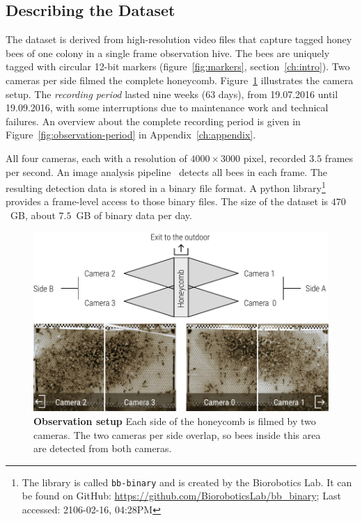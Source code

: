 \subsection{Describing the Dataset}
\label{sec:dataset}
The dataset is derived from high-resolution video files that capture tagged honey bees of one colony in a single frame observation hive.
The bees are uniquely tagged with circular 12-bit markers (figure~\ref{fig:markers}, section~\ref{ch:intro}).
Two cameras per side filmed the complete honeycomb.
Figure~\ref{fig:obssetup} illustrates the camera setup.
The \emph{recording period} lasted nine weeks (63 days), from 19.07.2016 until 19.09.2016, with some interruptions due to maintenance work and technical failures.
An overview about the complete recording period is given in Figure~\ref{fig:observation-period} in Appendix~\ref{ch:appendix}.

All four cameras, each with a resolution of $4000\times3000$ pixel, recorded $3.5$ frames per second. 
An image analysis pipeline~\cite{wario2015automatic} detects all bees in each frame.
The resulting detection data is stored in a binary file format.
A python library\footnote{The library is called \texttt{bb-binary} and is created by the Biorobotics Lab. It can be found on GitHub: \url{https://github.com/BioroboticsLab/bb_binary}; Last accessed: 2106-02-16, 04:28PM} provides a frame-level access to those binary files.
The size of the dataset is $470$~GB, about $7.5$~GB of binary data per day.

\begin{figure}
	\centering
	\includegraphics[width=1.0\textwidth]{Figures/setupCams}
 	\caption[Observation setup]{\textbf{Observation setup} Each side of the honeycomb is filmed by two cameras. The two cameras per side overlap, so bees inside this area are detected from both cameras.}
 	\label{fig:obssetup}
\end{figure}

